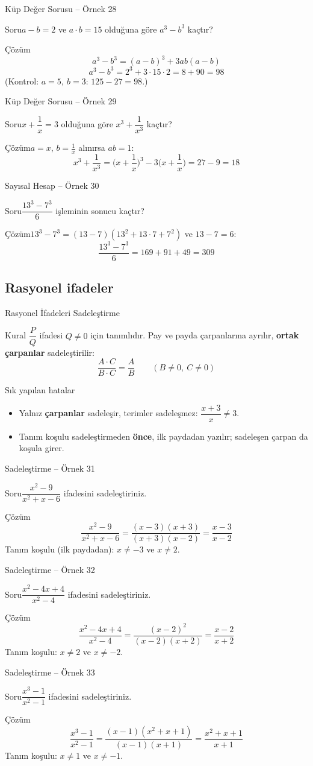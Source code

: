 \documentclass[aspectratio=169,11pt,handout]{beamer}
\newcommand{\soru}[3]{%
\begin{frame}{#1}
  \begin{block}{Soru}\large #2\end{block}
  \pause
  \begin{exampleblock}{Çözüm}\large #3\end{exampleblock}
\end{frame}}
\begin{document}
\soru{Küp Değer Sorusu -- Örnek 28}
{\(a-b=2\) ve \(a\cdot b=15\) olduğuna göre \(a^3-b^3\) kaçtır?}
{\[a^3-b^3=(a-b)^3+3ab(a-b)\]
\[a^3-b^3=2^3+3\cdot 15\cdot 2=8+90=98\]
(Kontrol: \(a=5,\ b=3\): \(125-27=98\).)}

\soru{Küp Değer Sorusu -- Örnek 29}
{\(x+\dfrac{1}{x}=3\) olduğuna göre \(x^3+\dfrac{1}{x^3}\) kaçtır?}
{\(a=x\), \(b=\frac{1}{x}\) alınırsa \(ab=1\):
\[x^3+\frac{1}{x^3}=\Big(x+\frac{1}{x}\Big)^3-3\Big(x+\frac{1}{x}\Big)=27-9=18\]}

\soru{Sayısal Hesap -- Örnek 30}
{\(\dfrac{13^3-7^3}{6}\) işleminin sonucu kaçtır?}
{\(13^3-7^3=(13-7)(13^2+13\cdot 7+7^2)\) ve \(13-7=6\):
\[\frac{13^3-7^3}{6}=169+91+49=309\]}

\subsection{Rasyonel ifadeler}
\begin{frame}{Rasyonel İfadeleri Sadeleştirme}
\begin{block}{Kural}
\(\dfrac{P}{Q}\) ifadesi \(Q\neq 0\) için tanımlıdır. Pay ve payda çarpanlarına ayrılır, \textbf{ortak çarpanlar} sadeleştirilir:
\[\frac{A\cdot C}{B\cdot C}=\frac{A}{B}\qquad(B\neq 0,\ C\neq 0)\]
\end{block}
\begin{alertblock}{Sık yapılan hatalar}
\begin{itemize}
\item Yalnız \textbf{çarpanlar} sadeleşir, terimler sadeleşmez: \(\dfrac{x+3}{x}\neq 3\).
\item Tanım koşulu sadeleştirmeden \textbf{önce}, ilk paydadan yazılır; sadeleşen çarpan da koşula girer.
\end{itemize}
\end{alertblock}
\end{frame}

\soru{Sadeleştirme -- Örnek 31}
{\(\dfrac{x^2-9}{x^2+x-6}\) ifadesini sadeleştiriniz.}
{\[\frac{x^2-9}{x^2+x-6}=\frac{(x-3)(x+3)}{(x+3)(x-2)}=\frac{x-3}{x-2}\]
Tanım koşulu (ilk paydadan): \(x\neq -3\) ve \(x\neq 2\).}

\soru{Sadeleştirme -- Örnek 32}
{\(\dfrac{x^2-4x+4}{x^2-4}\) ifadesini sadeleştiriniz.}
{\[\frac{x^2-4x+4}{x^2-4}=\frac{(x-2)^2}{(x-2)(x+2)}=\frac{x-2}{x+2}\]
Tanım koşulu: \(x\neq 2\) ve \(x\neq -2\).}

\soru{Sadeleştirme -- Örnek 33}
{\(\dfrac{x^3-1}{x^2-1}\) ifadesini sadeleştiriniz.}
{\[\frac{x^3-1}{x^2-1}=\frac{(x-1)(x^2+x+1)}{(x-1)(x+1)}=\frac{x^2+x+1}{x+1}\]
Tanım koşulu: \(x\neq 1\) ve \(x\neq -1\).}
\end{document}
